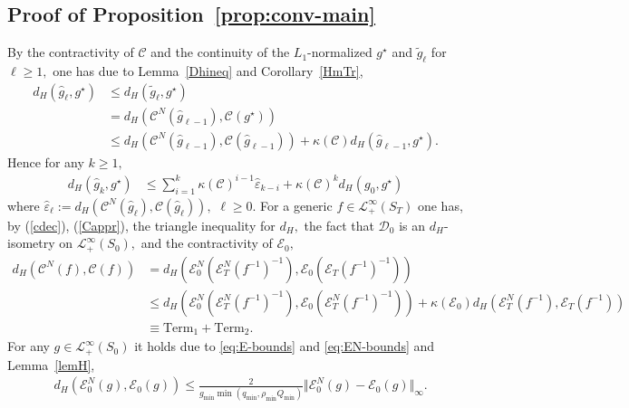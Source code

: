 \documentclass[a4paper,11pt]{amsart}
\theoremstyle{plain}
\theoremstyle{remark}
\begin{document}
\subsection{Proof of Proposition~\ref{prop:conv-main}}
By the
contractivity of $\mathcal{C}$ and the continuity of the $L_1$-normalized $g^{\star}$ and $\widetilde{g}_{\ell}$ for $\ell\geq1,$ one has due to Lemma~\ref{Dhineq} and Corollary~\ref{HmTr},  %
\begin{align*}
d_{H}(\widehat{g}_{\ell},g^{\star})  &  \leq  d_{H}(\widetilde{g}_{\ell},g^{\star})
\\
&=d_{H}(\mathcal{C}^{N}%
(\widehat{g}_{\ell-1}),\mathcal{C}(g^{\star})  )\\
&  \leq d_{H}(\mathcal{C}^{N}(\widehat{g}_{\ell-1}),\mathcal{C}(
\widehat{g}_{\ell-1})  )+\kappa( \mathcal{C})  d_{H}%
(\widehat{g}_{\ell-1},g^{\star}).
\end{align*}
Hence for any $k\geq 1,$
\begin{align}
d_{H}(\widehat{g}_{k},g^{\star})  &  \leq\sum_{i=1}^{k}\kappa(
\mathcal{C})  ^{i-1}\widehat{\varepsilon}_{k-i}+\kappa(
\mathcal{C})  ^{k}d_{H}(g_{0},g^{\star})\nonumber
\end{align}
where \(\widehat\varepsilon_{\ell}:= d_{H}(\mathcal{C}^{N}(\widehat{g}%
_{\ell}),\mathcal{C}( \widehat{g}_{\ell})  ),\) \(\ell\geq 0.\) 
For a generic $f\in\mathcal{L}_{+}^{\infty}(S_{T})$ one has, by (\ref{cdec}),
(\ref{Cappr}), the triangle inequality for $d_{H},$ the fact that
$\mathcal{D}_{0}$ is an $d_{H}$-isometry on $\mathcal{L}_{+}^{\infty}(S_{0}),$
and the contractivity of $\mathcal{E}_{0},$
\begin{align*}
  d_{H}(\mathcal{C}^{N}(f),\mathcal{C}(f) )&=d_{H}(
\mathcal{E}_{0}^{N}(  \mathcal{E}_{T}^{N}(f^{-1}%
)^{-1})  ,\mathcal{E}_{0}(  \mathcal{E}_{T}(f^{-1})^{-1})) \nonumber\\
&  \leq d_{H}(  \mathcal{E}_{0}^{N}(  \mathcal{E}%
_{T}^{N}(f^{-1})^{-1})  ,\mathcal{E}_{0}(  \mathcal{E}%
_{T}^{N}(f^{-1})^{-1}))  +\kappa (  \mathcal{E}_{0})  d_{H}(  \mathcal{E}%
_{T}^{N}(f^{-1}),\mathcal{E}_{T}(f^{-1})) \nonumber\\
&  \equiv\text{Term}_{1}+\text{Term}_{2}.
\end{align*}
For any $g\in\mathcal{L}_{+}^{\infty}(S_{0})$ it holds due to \eqref{eq:E-bounds} and \eqref{eq:EN-bounds} and Lemma~\ref{lemH},
\begin{align}
&  d_{H}\left(  \mathcal{E}_{0}^{N}(g),\mathcal{E}_{0}(g)\right)
\nonumber  \leq\frac{2}{g_{\min } \min(q_{\min},\rho_{\min}Q_{\min})}\Vert \mathcal{E}%
_{0}^{N}(g)-\mathcal{E}_{0}(g)\Vert _{\infty}. \label{dHe2}%
\end{align}
\end{document}
